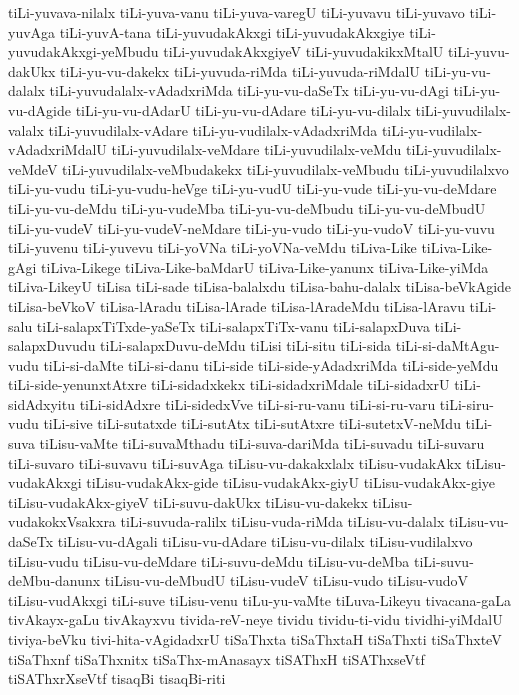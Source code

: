 {tiLi-yuvava-nilalx
tiLi-yuva-vanu
tiLi-yuva-varegU
tiLi-yuvavu
tiLi-yuvavo
tiLi-yuvAga
tiLi-yuvA-tana
tiLi-yuvudakAkxgi
tiLi-yuvudakAkxgiye
tiLi-yuvudakAkxgi-yeMbudu
tiLi-yuvudakAkxgiyeV
tiLi-yuvudakikxMtalU
tiLi-yuvu-dakUkx
tiLi-yu-vu-dakekx
tiLi-yuvuda-riMda
tiLi-yuvuda-riMdalU
tiLi-yu-vu-dalalx
tiLi-yuvudalalx-vAdadxriMda
tiLi-yu-vu-daSeTx
tiLi-yu-vu-dAgi
tiLi-yu-vu-dAgide
tiLi-yu-vu-dAdarU
tiLi-yu-vu-dAdare
tiLi-yu-vu-dilalx
tiLi-yuvudilalx-valalx
tiLi-yuvudilalx-vAdare
tiLi-yu-vudilalx-vAdadxriMda
tiLi-yu-vudilalx-vAdadxriMdalU
tiLi-yuvudilalx-veMdare
tiLi-yuvudilalx-veMdu
tiLi-yuvudilalx-veMdeV
tiLi-yuvudilalx-veMbudakekx
tiLi-yuvudilalx-veMbudu
tiLi-yuvudilalxvo
tiLi-yu-vudu
tiLi-yu-vudu-heVge
tiLi-yu-vudU
tiLi-yu-vude
tiLi-yu-vu-deMdare
tiLi-yu-vu-deMdu
tiLi-yu-vudeMba
tiLi-yu-vu-deMbudu
tiLi-yu-vu-deMbudU
tiLi-yu-vudeV
tiLi-yu-vudeV-neMdare
tiLi-yu-vudo
tiLi-yu-vudoV
tiLi-yu-vuvu
tiLi-yuvenu
tiLi-yuvevu
tiLi-yoVNa
tiLi-yoVNa-veMdu
tiLiva-Like
tiLiva-Like-gAgi
tiLiva-Likege
tiLiva-Like-baMdarU
tiLiva-Like-yanunx
tiLiva-Like-yiMda
tiLiva-LikeyU
tiLisa
tiLi-sade
tiLisa-balalxdu
tiLisa-bahu-dalalx
tiLisa-beVkAgide
tiLisa-beVkoV
tiLisa-lAradu
tiLisa-lArade
tiLisa-lAradeMdu
tiLisa-lAravu
tiLi-salu
tiLi-salapxTiTxde-yaSeTx
tiLi-salapxTiTx-vanu
tiLi-salapxDuva
tiLi-salapxDuvudu
tiLi-salapxDuvu-deMdu
tiLisi
tiLi-situ
tiLi-sida
tiLi-si-daMtAgu-vudu
tiLi-si-daMte
tiLi-si-danu
tiLi-side
tiLi-side-yAdadxriMda
tiLi-side-yeMdu
tiLi-side-yenunxtAtxre
tiLi-sidadxkekx
tiLi-sidadxriMdale
tiLi-sidadxrU
tiLi-sidAdxyitu
tiLi-sidAdxre
tiLi-sidedxVve
tiLi-si-ru-vanu
tiLi-si-ru-varu
tiLi-siru-vudu
tiLi-sive
tiLi-sutatxde
tiLi-sutAtx
tiLi-sutAtxre
tiLi-sutetxV-neMdu
tiLi-suva
tiLisu-vaMte
tiLi-suvaMthadu
tiLi-suva-dariMda
tiLi-suvadu
tiLi-suvaru
tiLi-suvaro
tiLi-suvavu
tiLi-suvAga
tiLisu-vu-dakakxlalx
tiLisu-vudakAkx
tiLisu-vudakAkxgi
tiLisu-vudakAkx-gide
tiLisu-vudakAkx-giyU
tiLisu-vudakAkx-giye
tiLisu-vudakAkx-giyeV
tiLi-suvu-dakUkx
tiLisu-vu-dakekx
tiLisu-vudakokxVsakxra
tiLi-suvuda-ralilx
tiLisu-vuda-riMda
tiLisu-vu-dalalx
tiLisu-vu-daSeTx
tiLisu-vu-dAgali
tiLisu-vu-dAdare
tiLisu-vu-dilalx
tiLisu-vudilalxvo
tiLisu-vudu
tiLisu-vu-deMdare
tiLi-suvu-deMdu
tiLisu-vu-deMba
tiLi-suvu-deMbu-danunx
tiLisu-vu-deMbudU
tiLisu-vudeV
tiLisu-vudo
tiLisu-vudoV
tiLisu-vudAkxgi
tiLi-suve
tiLisu-venu
tiLu-yu-vaMte
tiLuva-Likeyu
tivacana-gaLa
tivAkayx-gaLu
tivAkayxvu
tivida-reV-neye
tividu
tividu-ti-vidu
tividhi-yiMdalU
tiviya-beVku
tivi-hita-vAgidadxrU
tiSaThxta
tiSaThxtaH
tiSaThxti
tiSaThxteV
tiSaThxnf
tiSaThxnitx
tiSaThx-mAnasayx
tiSAThxH
tiSAThxseVtf
tiSAThxrXseVtf
tisaqBi
tisaqBi-riti
}
